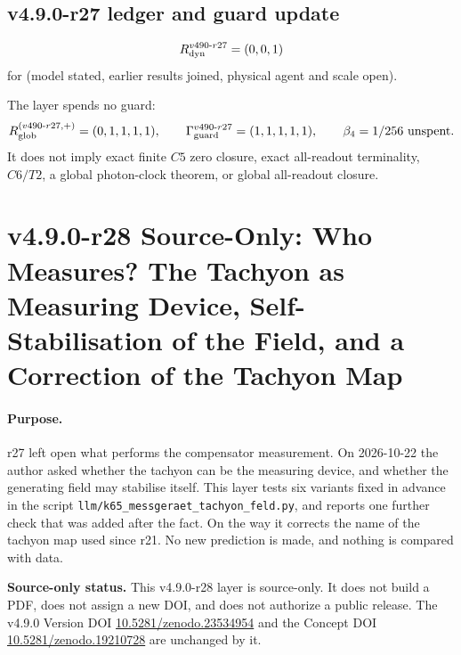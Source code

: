 \subsection*{v4.9.0-r27 ledger and guard update}
\label{subsec:v490-r27-ledger-guard}

\[
R_{\rm dyn}^{v490\text{-}r27}=(0,0,1)
\]
for (model stated, earlier results joined, physical agent and scale open).

The layer spends no guard:
\[
R_{\rm glob}^{(v490\text{-}r27,+)}=(0,1,1,1,1),
\qquad
\Gamma_{\rm guard}^{v490\text{-}r27}=(1,1,1,1,1),
\qquad
\beta_4=1/256\ \text{unspent}.
\]
It does not imply exact finite \(C5\) zero closure, exact all-readout terminality,
\(C6/T2\), a global photon-clock theorem, or global all-readout closure.

\clearpage
\section*{v4.9.0-r28 Source-Only: Who Measures? The Tachyon as Measuring Device, Self-Stabilisation of the Field, and a Correction of the Tachyon Map}
\label{sec:v490-r28-who-measures}

\paragraph{Purpose.}
r27 left open what performs the compensator measurement.  On 2026-10-22 the author asked whether the tachyon can be the
measuring device, and whether the generating field may stabilise itself.  This layer tests six variants fixed in advance in the
script \texttt{llm/k65\_messgeraet\_tachyon\_feld.py}, and reports one further check that was added after the fact.  On the way it
corrects the name of the tachyon map used since r21.  No new prediction is made, and nothing is compared with data.

\noindent\textbf{Source-only status.}
This v4.9.0-r28 layer is source-only.  It does not build a PDF, does not assign a new DOI,
and does not authorize a public release.  The v4.9.0 Version DOI
\href{https://doi.org/10.5281/zenodo.23534954}{10.5281/zenodo.23534954} and the Concept DOI
\href{https://doi.org/10.5281/zenodo.19210728}{10.5281/zenodo.19210728} are unchanged by it.

